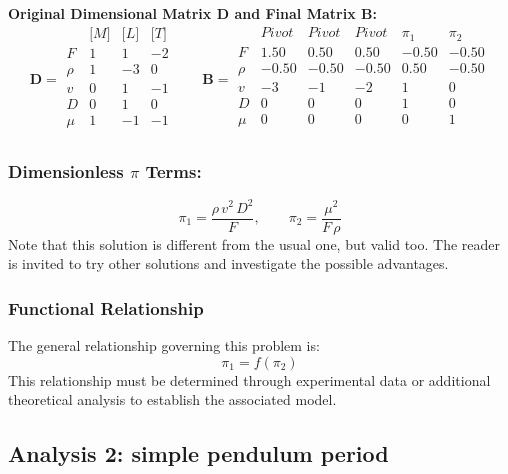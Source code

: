 \textbf{Original Dimensional Matrix $\mathbf{D}$ and Final Matrix $\mathbf{B}$:}
\begin{equation}\mathbf{D} = \begin{array}{r|rrr}
& \text{[}M\text{]} & \text{[}L\text{]} & \text{[}T\text{]} \\
\hline
F & 1 & 1 & -2 \\
\rho & 1 & -3 & 0 \\
v & 0 & 1 & -1 \\
D & 0 & 1 & 0 \\
\mu & 1 & -1 & -1 \\
\end{array}
\qquad
\mathbf{B} = \begin{array}{r|rrrrr}
& Pivot & Pivot & Pivot & \pi_{1} & \pi_{2} \\
\hline
F & 1.50 & 0.50 & 0.50 & -0.50 & -0.50 \\
\rho & -0.50 & -0.50 & -0.50 & 0.50 & -0.50 \\
v & -3 & -1 & -2 & 1 & 0 \\
D & 0 & 0 & 0 & 1 & 0 \\
\mu & 0 & 0 & 0 & 0 & 1 \\
\end{array}\end{equation}

\subsubsection*{Dimensionless $\pi$ Terms:}
\begin{equation}
\pi_{1} = \frac{\rho \, v^{2} \, D^{2}}{F}, \qquad
\pi_{2} = \frac{\mu^{2}}{F \, \rho}
\end{equation}
Note that this solution is different from the usual one, but valid too. The reader is invited to try other solutions and investigate the possible advantages.

\subsubsection*{Functional Relationship}
The general relationship governing this problem is:
\begin{equation}
\pi_1 = f(\pi_2)
\end{equation}
This relationship must be determined through experimental data or additional theoretical analysis to establish the associated model.

\subsection{Analysis 2: simple pendulum period}
\label{sec:Simple_Pendulum_Period}


